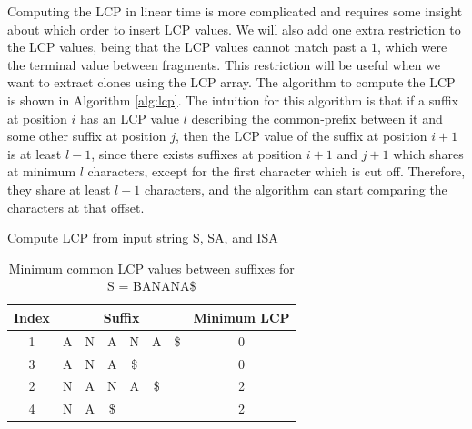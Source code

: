 Computing the LCP in linear time is more complicated and requires some insight about which
order to insert LCP values. We will also add one extra restriction to the LCP values,
being that the LCP values cannot match past a $1$, which were the terminal value between
fragments. This restriction will be useful when we want to extract clones using the LCP
array. The algorithm to compute the LCP is shown in Algorithm \ref{alg:lcp}. The intuition
for this algorithm is that if a suffix at position $i$ has an LCP value $l$ describing the
common-prefix between it and some other suffix at position $j$, then the LCP value of the
suffix at position $i + 1$ is at least $l - 1$, since there exists suffixes at position $i
+ 1$ and $j + 1$ which shares at minimum $l$ characters, except for the first character
which is cut off. Therefore, they share at least $l - 1$ characters, and the algorithm can
start comparing the characters at that offset.

\begin{algorithm}[t]
  \SetAlgoLined\DontPrintSemicolon

  \vspace{0.5cm}
  \caption{Compute LCP from input string S, SA, and ISA}
  \label{alg:lcp}
\end{algorithm}

\begin{table}[t]
    \begin{center}
        \begin{tabular}[c]{c|cccccc|c}
            Index & \multicolumn{6}{c}{Suffix} & Minimum LCP \\
            \hline
            1 & A & N & A & N & A & \$ & 0 \\ 
            3 & A & N & A & \$ &  &  & 0\\ 
            2 & N & A & N & A & \$ & & 2 \\ 
            4 & N & A & \$ & & &  & 2\\ 

        \end{tabular}
    \end{center}
    \caption{Minimum common LCP values between suffixes for S = BANANA\$}
    \label{tab:}
\end{table}

